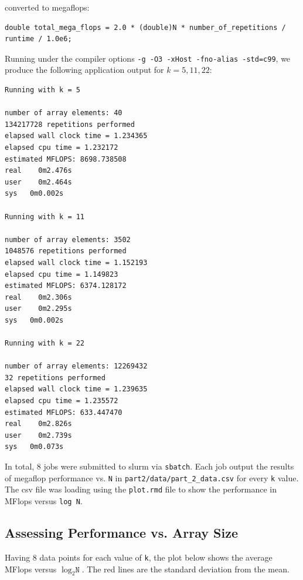 \documentclass{article}
\begin{document}
converted to megaflops:
\begin{lstlisting}
double total_mega_flops = 2.0 * (double)N * number_of_repetitions / runtime / 1.0e6;
\end{lstlisting}
Running under the compiler options \texttt{-g -O3 -xHost -fno-alias -std=c99}, we produce the following application output for $k=5, 11, 22$:
\begin{lstlisting}
Running with k = 5

number of array elements: 40
134217728 repetitions performed
elapsed wall clock time = 1.234365
elapsed cpu time = 1.232172
estimated MFLOPS: 8698.738508
real	0m2.476s
user	0m2.464s
sys   0m0.002s

Running with k = 11

number of array elements: 3502
1048576 repetitions performed
elapsed wall clock time = 1.152193
elapsed cpu time = 1.149823
estimated MFLOPS: 6374.128172
real	0m2.306s
user	0m2.295s
sys   0m0.002s

Running with k = 22

number of array elements: 12269432
32 repetitions performed
elapsed wall clock time = 1.239635
elapsed cpu time = 1.235572
estimated MFLOPS: 633.447470
real	0m2.826s
user	0m2.739s
sys   0m0.073s
\end{lstlisting}
In total, 8 jobs were submitted to slurm via \texttt{sbatch}. Each job output the results of megaflop performance vs. \texttt{N} 
in \texttt{part2/data/part\_2\_data.csv} for every \texttt{k} value. The csv file was loading using the \texttt{plot.rmd} file to show the performance in MFlops versus \texttt{log N}.

\subsection*{Assessing Performance vs. Array Size}
Having 8 data points for each value of \texttt{k}, the plot below shows the average 
MFlops versus $\log_2 \texttt{N}$. The red lines are the standard deviation from the mean.
\end{document}
